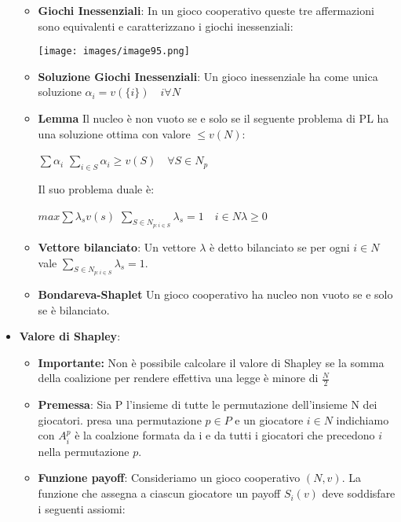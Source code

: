 \documentclass{article}
\theoremstyle{definition}
\theoremstyle{remark}
\begin{document}
\begin{itemize}
\begin{itemize}
        \item\textbf{Giochi Inessenziali}: In un gioco cooperativo queste tre affermazioni sono equivalenti e caratterizzano i giochi inessenziali:\begin{center}
            \texttt{[image: images/image95.png]}
        \end{center}
        \item\textbf{Soluzione Giochi Inessenziali}: Un gioco inessenziale ha come unica soluzione $\alpha_i=v(\{i\})\quad i\forall N$
        \item \textbf{Lemma} Il nucleo è non vuoto se e solo se il seguente problema di PL ha una soluzione ottima con valore $\leq v(N)$: \begin{center}
            $\sum \alpha_i$\newline
            $\sum_{i\in S}\alpha_i\geq v(S)\quad \forall S \in N_p$
        \end{center}
        Il suo problema duale è:\begin{center}
            $max \sum\lambda_sv(s)$\newline
            $\sum_{S\in N_{p:i\in S}}\lambda_s=1\quad i \in N$\newline $\lambda\geq0$
        \end{center}
        \item \textbf{Vettore bilanciato}: Un vettore $\lambda$ è detto bilanciato se per ogni $i\in N$ vale $\sum_{S\in N_{p:i\in S}}\lambda_s=1$.
        \item\textbf{Bondareva-Shaplet} Un gioco cooperativo ha nucleo non vuoto se e solo se è bilanciato.
    \end{itemize} 
    \item \textbf{Valore di Shapley}:\begin{itemize}
    \item \textbf{Importante:} Non è possibile calcolare il valore di Shapley se la somma della coalizione per rendere effettiva una legge è minore di \(\frac{N}{2}\)
        \item \textbf{Premessa}: Sia P l'insieme di tutte le permutazione dell'insieme N dei giocatori. presa una permutazione $p\in P$ e un giocatore $i\in N$ indichiamo con $A_i^p$ è la coalzione formata da i e da tutti i giocatori che precedono $i$ nella permutazione $p$.
        \item\textbf{Funzione payoff}: Consideriamo un gioco cooperativo $(N,v)$. La funzione che assegna a ciascun giocatore un payoff $S_i(v)$ deve soddisfare i seguenti assiomi:\begin{itemize}

\end{itemize}
\end{itemize}
\end{itemize}
\end{document}

